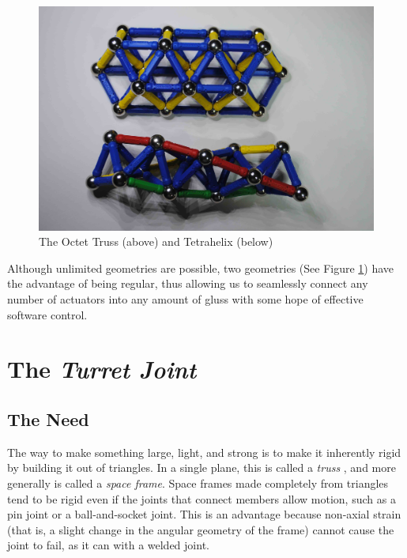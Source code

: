 \documentclass[11pt]{article}
\begin{document}
\begin{figure}[!ht]
  \centering
    \includegraphics[width=1.0\textwidth]{figureslowres/TwoGeometries.jpg}
    \caption[The Octet Truss (above) and Tetrahelix (below)]{The Octet Truss (above) and Tetrahelix (below)}
      \label{twogeometries}
\end{figure}


Although unlimited geometries are possible, two geometries (See Figure \ref{twogeometries}) 
have the advantage of being regular, thus allowing us to
seamlessly connect any number of actuators into any amount of gluss with some hope of effective software control.

\section{The \textit{Turret Joint}}

\subsection{The Need}

The way to make something large, light, and strong is to make it inherently rigid by building it
out of triangles. In a single plane, this is called a \emph{truss} \cite{ambrose1993building}, and more generally is called
a \emph{space frame}.  Space frames made completely from triangles tend to be rigid even if the
joints that connect members allow motion, such as a pin joint or a ball-and-socket joint. This
is an advantage because non-axial strain
(that is, a slight change in the angular geometry of the frame) cannot cause
the joint to fail, as it can with a welded joint.
\end{document}
